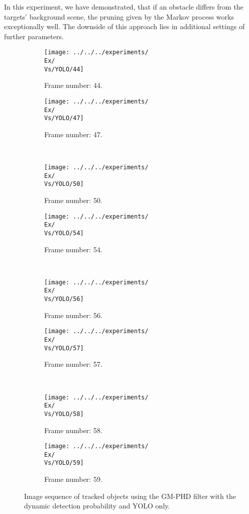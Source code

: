 In this experiment, we have demonstrated, that if an obstacle differs from the targets' background scene, the pruning given by the Markov process works exceptionally well. The downside of this approach lies in additional settings of further parameters.
\begin{figure}[H]
    \centering
    \begin{subfigure}{0.48\textwidth}
        \centering
        \texttt{[image: ../../../experiments/\\Ex/\\Vs/YOLO/44]}
        \caption{Frame number: 44.}
        \label{fig:\Ex-\Vs-\Set:01}
    \end{subfigure}
    \begin{subfigure}{0.48\textwidth}
        \centering
        \texttt{[image: ../../../experiments/\\Ex/\\Vs/YOLO/47]}
        \caption{Frame number: 47.}
        \label{fig:\Ex-\Vs-\Set:02}
    \end{subfigure}
    \\
    \begin{subfigure}{0.48\textwidth}
        \centering
        \texttt{[image: ../../../experiments/\\Ex/\\Vs/YOLO/50]}
        \caption{Frame number: 50.}
        \label{fig:\Ex-\Vs-\Set:03}
    \end{subfigure}
    \begin{subfigure}{0.48\textwidth}
        \centering
        \texttt{[image: ../../../experiments/\\Ex/\\Vs/YOLO/54]}
        \caption{Frame number: 54.}
        \label{fig:\Ex-\Vs-\Set:04}
    \end{subfigure}
    \\
    \begin{subfigure}{0.48\textwidth}
        \centering
        \texttt{[image: ../../../experiments/\\Ex/\\Vs/YOLO/56]}
        \caption{Frame number: 56.}
        \label{fig:\Ex-\Vs-\Set:05}
    \end{subfigure}
    \begin{subfigure}{0.48\textwidth}
        \centering
        \texttt{[image: ../../../experiments/\\Ex/\\Vs/YOLO/57]}
        \caption{Frame number: 57.}
        \label{fig:\Ex-\Vs-\Set:06}
    \end{subfigure}
    \\
    \begin{subfigure}{0.48\textwidth}
        \centering
        \texttt{[image: ../../../experiments/\\Ex/\\Vs/YOLO/58]}
        \caption{Frame number: 58.}
        \label{fig:\Ex-\Vs-\Set:07}
    \end{subfigure}
    \begin{subfigure}{0.48\textwidth}
        \centering
        \texttt{[image: ../../../experiments/\\Ex/\\Vs/YOLO/59]}
        \caption{Frame number: 59.}
        \label{fig:\Ex-\Vs-\Set:08}
    \end{subfigure}
    \caption{Image sequence of tracked objects using the GM-PHD filter with the dynamic detection probability and YOLO only.}
    \label{fig:\Ex-\Vs-\Set}
\end{figure}

